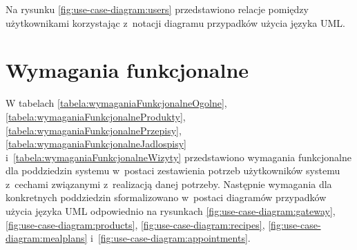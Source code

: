 Na rysunku \ref{fig:use-case-diagram:users} przedstawiono relacje pomiędzy użytkownikami korzystając z~notacji diagramu przypadków użycia języka UML.


\section{Wymagania funkcjonalne}\label{sec:functional-requirements}
\par
W tabelach \ref{tabela:wymaganiaFunkcjonalneOgolne}, \ref{tabela:wymaganiaFunkcjonalneProdukty}, \ref{tabela:wymaganiaFunkcjonalnePrzepisy}, \ref{tabela:wymaganiaFunkcjonalneJadlospisy} i~\ref{tabela:wymaganiaFunkcjonalneWizyty}
przedstawiono wymagania funkcjonalne dla poddziedzin systemu w~postaci zestawienia potrzeb użytkowników systemu z~cechami związanymi z~realizacją danej potrzeby.
Następnie wymagania dla konkretnych poddziedzin sformalizowano w~postaci diagramów przypadków użycia języka UML odpowiednio
na rysunkach \ref{fig:use-case-diagram:gateway}, \ref{fig:use-case-diagram:products}, \ref{fig:use-case-diagram:recipes}, \ref{fig:use-case-diagram:mealplans} i~\ref{fig:use-case-diagram:appointments}.

